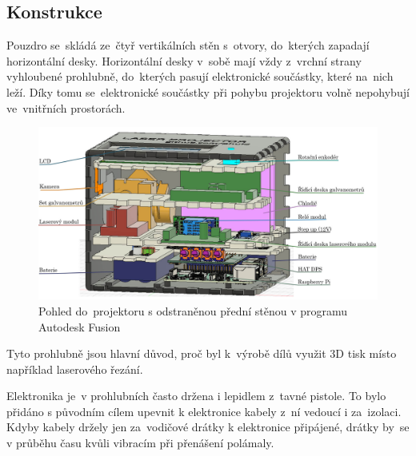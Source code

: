 \subsection{Konstrukce}
Pouzdro se~skládá ze~čtyř vertikálních stěn s~otvory, do~kterých zapadají horizontální desky. Horizontální desky v~sobě mají vždy z~vrchní strany vyhloubené prohlubně, do~kterých pasují elektronické součástky, které na~nich leží. Díky tomu se~elektronické součástky při pohybu projektoru volně nepohybují ve~vnitřních prostorách.

\begin{figure}[htb]
  \centering
  \includegraphics[width=1\textwidth]{img/case-sideview.jpg}
  \caption{\label{fig:case-sideview} Pohled do~projektoru s odstraněnou přední stěnou v programu Autodesk Fusion}
\end{figure}

Tyto prohlubně jsou hlavní důvod, proč byl k~výrobě dílů využit 3D tisk místo například laserového řezání.

Elektronika je~v prohlubních často držena i lepidlem z~tavné pistole.
To bylo přidáno s původním cílem upevnit k elektronice kabely z~ní vedoucí i za~izolaci. Kdyby kabely držely jen za~vodičové drátky k elektronice připájené, drátky by~se v průběhu času kvůli vibracím při přenášení polámaly.


